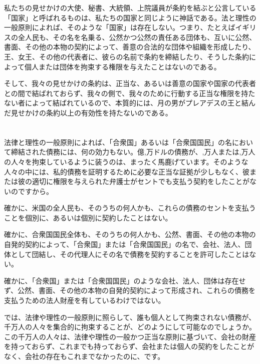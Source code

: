 \documentclass[dvipdfmx, uplatex, tate, landscape]{utbook}
\begin{document}
私たちの見せかけの大使、秘書、大統領、上院議員が条約を結ぶと公言している「国家」と呼ばれるものは、私たちの国家と同じように神話である。法と理性の一般原則によれば、そのような「国家」は存在しない。つまり、たとえばイギリスの全人民も、その名を名乗る、公然かつ公然の責任ある団体も、互いに公然、書面、その他の本物の契約によって、善意の合法的な団体や組織を形成したり、王、女王、その他の代表者に、彼らの名前で条約を締結したり、そうした条約によって個人または団体を拘束する権限を与えたことはないのである。

そして、我々の見せかけの条約は、正当な、あるいは善意の国家や国家の代表者との間で結ばれておらず、我々の側で、我々のために行動する正当な権限を持たない者によって結ばれているので、本質的には、月の男がプレアデスの王と結んだ見せかけの条約以上の有効性を持たないのである。

\chapter{}

法律と理性の一般原則によれば、「合衆国」あるいは「合衆国国民」の名において締結された債務には、何の効力もない。億,万ドルの債務が、,万人または,万人の人々を拘束しているように装うのは、まったく馬鹿げています。そのような人々の中には、私的債務を証明するために必要な正当な証拠が少しもなく、彼または彼の適切に権限を与えられた弁護士がセントでも支払う契約をしたことがないのですから。

確かに、米国の全人民も、そのうちの何人かも、これらの債務のセントを支払うことを個別に、あるいは個別に契約したことはない。

確かに、合衆国国民全体も、そのうちの何人かも、公然、書面、その他の本物の自発的契約によって、「合衆国」または「合衆国国民」の名で、会社、法人、団体として団結し、その代理人にその名で債務を契約することを許可したことはない。

確かに、「合衆国」または「合衆国国民」のような会社、法人、団体は存在せず、公然、書面、その他の本物の自発的契約によって形成され、これらの債務を支払うための法人財産を有しているわけではない。

では、法律や理性の一般原則に照らして、誰も個人として拘束されない債務が、千万人の人々を集合的に拘束することが、どのようにして可能なのでしょうか。この千万人の人々は、法律や理性の一般かつ正当な原則に基づいて、会社の財産を持っておらず、これまでも持っておらず、会社または個人の契約をしたことがなく、会社の存在もこれまでなかったのに、です。
\end{document}
